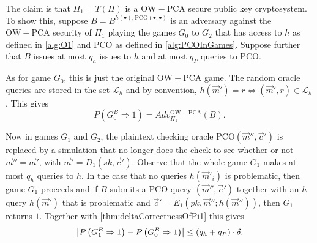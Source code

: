 The claim is that $\Pi_1 = T\left(\Pi\right)$ is a $\mathrm{OW-PCA}$ secure public key cryptosystem. To show this, suppose $B = B^{h\left(\bullet\right), \mathrm{PCO}\left(\bullet, \bullet\right)}$ is an adversary against the $\mathrm{OW-PCA}$ security of $\Pi_1$ playing the games $G_0$ to $G_2$ that has access to $h$ as defined in \cref{alg:O1} and $\mathrm{PCO}$ as defined in \cref{alg:PCOInGames}. Suppose further that $B$ issues at most $q_{h}$ issues to $h$ and at most $q_{P}$ queries to $\mathrm{PCO}$.

As for game $G_0$, this is just the original $\mathrm{OW-PCA}$ game. The random oracle queries are stored in the set $\mathcal{L}_{h}$ and by convention, $h\left(\vec{m}'\right) = r \Leftrightarrow \left(\vec{m}', r\right) \in \mathcal{L}_{h}$. This gives
\[
	P\left( G_0^{B} \Rightarrow 1 \right) = Adv_{\Pi_1}^{\mathrm{OW-PCA}}\left(B\right).
\]

Now in games $G_1$ and $G_2$, the plaintext checking oracle $\mathrm{PCO}\left(\vec{m}'', \vec{c}'\right)$ is replaced by a simulation that no longer does the check to see whether or not $\vec{m}'' = \vec{m}'$, with $\vec{m}' = D_1\left(sk, \vec{c}'\right)$. Observe that the whole game $G_1$ makes at most $q_{h}$ queries to $h$. In the case that no queries $h\left(\vec{m}'_i\right)$ is problematic, then game $G_1$ proceeds and if $B$ submits a $\mathrm{PCO}$ query $\left(\vec{m}'', \vec{c}'\right)$ together with an $h$ query $h\left(\vec{m}'\right)$ that is problematic and $\vec{c}' = E_1\left(pk, \vec{m}''; h\left(\vec{m}''\right)\right)$, then $G_1$ returns $1$. Together with \cref{thm:deltaCorrectnessOfPi1} this gives
\[
	\left\vert P\left( G_1^B \Rightarrow 1 \right) - P\left( G_0^B \Rightarrow 1 \right)  \right\vert \leq \left( q_{h} + q_P \right) \cdot \delta.
\]

